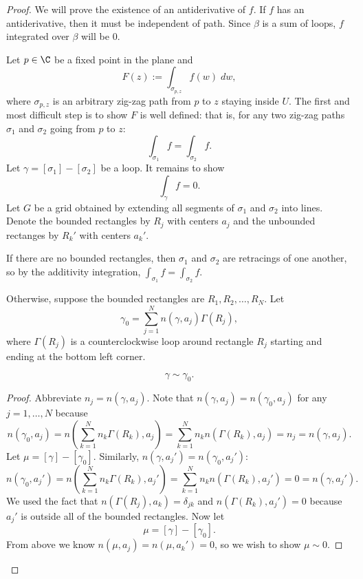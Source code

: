 \begin{proof}
    We will prove the existence of an antiderivative of $f$.
    If $f$ has an antiderivative, then it must be independent
    of path.
    Since $\beta$ is a sum of loops, $f$ integrated over $\beta$
    will be $0$.

    \noindent
    Let $p \in \C$ be a fixed point in the plane and 
    \[ F(z) := \int_{\sigma_{p, z}} f(w) \; dw, \]
    where $\sigma_{p, z}$ is an arbitrary zig-zag path from
    $p$ to $z$ staying inside $U$.
    The first and most difficult step is to show $F$ is well
    defined: that is, for any two zig-zag paths $\sigma_1$
    and $\sigma_2$ going from $p$ to $z$:
    \[ \int_{\sigma_1} f = \int_{\sigma_2} f. \]
    Let $\gamma = [\sigma_1] - [\sigma_2]$ be a loop.
    It remains to show
    \[ \int_{\gamma} f = 0. \]
    Let $G$ be a grid obtained by extending all segments of $\sigma_1$ 
    and $\sigma_2$ into lines.
    Denote the bounded rectangles by $R_j$ with centers $a_j$
    and the unbounded rectanges by $R_k'$ with centers $a_k'$.

    If there are no bounded rectangles, then $\sigma_1$ and
    $\sigma_2$ are retracings of one another, so by the
    additivity integration, $\int_{\sigma_1} f = \int_{\sigma_2}
    f$.

    Otherwise, suppose the bounded rectangles are $R_1, R_2, 
    \ldots, R_N$.
    Let
    \[ \gamma_0 = \sum_{j=1}^N n(\gamma, a_j) \Gamma(R_j), \]
    where $\Gamma(R_j)$ is a counterclockwise loop around
    rectangle $R_j$ starting and ending at the bottom left 
    corner.
    \begin{claim*}
        \[\gamma \sim \gamma_0. \]
    \end{claim*}
    \begin{proof}
        Abbreviate $n_j = n(\gamma, a_j)$.
        Note that $n(\gamma, a_j) = n(\gamma_0, a_j)$ for
        any $j = 1, \ldots, N$ because
        \[ n(\gamma_0, a_j) = n\left( \sum_{k=1}^N n_k \Gamma(R_k),
            a_j \right)
        = \sum_{k=1}^N n_k n(\Gamma(R_k), a_j)
        = n_j = n(\gamma, a_j). \]
        Let $\mu = [\gamma] - [\gamma_0]$.
        Similarly, $n(\gamma, a_j') = n(\gamma_0, a_j')$:
        \[ n(\gamma_0, a_j') = n\left( \sum_{k=1}^N n_k \Gamma(R_k),
            a_j' \right)
        = \sum_{k=1}^N n_k n(\Gamma(R_k), a_j')
        = 0 = n(\gamma, a_j'). \]
        We used the fact that $n(\Gamma(R_j), a_k) = \delta_{jk}$ and
        $n(\Gamma(R_k), a_j') = 0$ because $a_j'$
        is outside all of the bounded rectangles.
        Now let 
        \[ \mu = [\gamma] - [\gamma_0]. \]
        From above we know $n(\mu, a_j) = n(\mu, a_k') = 0$,
        so we wish to show $\mu \sim 0$.


\end{proof}
\end{proof}

